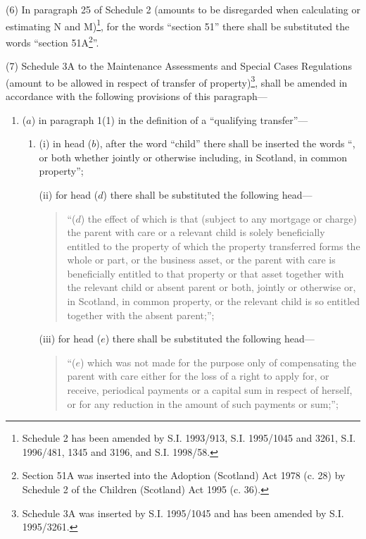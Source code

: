 \documentclass[12pt,a4paper]{article}
\begin{document}
(6) In paragraph 25 of Schedule 2 (amounts to be disregarded when calculating or estimating N and M)\footnote{\frenchspacing Schedule 2 has been amended by S.I. 1993/913, S.I. 1995/1045 and 3261, S.I. 1996/481, 1345 and 3196, and S.I. 1998/58.}, for the words “section 51” there shall be substituted the words “section 51A\footnote{\frenchspacing Section 51A was inserted into the Adoption (Scotland) Act 1978 (c. 28) by Schedule 2 of the Children (Scotland) Act 1995 (c. 36).}”.

(7) Schedule 3A to the Maintenance Assessments and Special Cases Regulations (amount to be allowed in respect of transfer of property)\footnote{\frenchspacing Schedule 3A was inserted by S.I. 1995/1045 and has been amended by S.I. 1995/3261.}, shall be amended in accordance with the following provisions of this paragraph—
\begin{enumerate}\item[]
($a$) in paragraph 1(1) in the definition of a “qualifying transfer”—
\begin{enumerate}\item[]
(i) in head ($b$), after the word “child” there shall be inserted the words “, or both whether jointly or otherwise including, in Scotland, in common property”;

(ii) for head ($d$) there shall be substituted the following head—
\begin{quotation}
“($d$) the effect of which is that (subject to any mortgage or charge) the parent with care or a relevant child is solely beneficially entitled to the property of which the property transferred forms the whole or part, or the business asset, or the parent with care is beneficially entitled to that property or that asset together with the relevant child or absent parent or both, jointly or otherwise or, in Scotland, in common property, or the relevant child is so entitled together with the absent parent;”;
\end{quotation}

(iii) for head ($e$) there shall be substituted the following head—
\begin{quotation}
“($e$) which was not made for the purpose only of compensating the parent with care either for the loss of a right to apply for, or receive, periodical payments or a capital sum in respect of herself, or for any reduction in the amount of such payments or sum;”;
\end{quotation}
\end{enumerate}


\end{enumerate}
\end{document}
